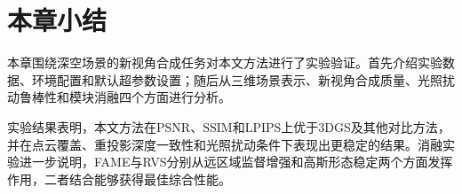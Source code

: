 

\section{本章小结}
本章围绕深空场景的新视角合成任务对本文方法进行了实验验证。首先介绍实验数据、环境配置和默认超参数设置；随后从三维场景表示、新视角合成质量、光照扰动鲁棒性和模块消融四个方面进行分析。

实验结果表明，本文方法在$\mathrm{PSNR}$、$\mathrm{SSIM}$和$\mathrm{LPIPS}$上优于3DGS及其他对比方法，并在点云覆盖、重投影深度一致性和光照扰动条件下表现出更稳定的结果。消融实验进一步说明，FAME与RVS分别从远区域监督增强和高斯形态稳定两个方面发挥作用，二者结合能够获得最佳综合性能。
